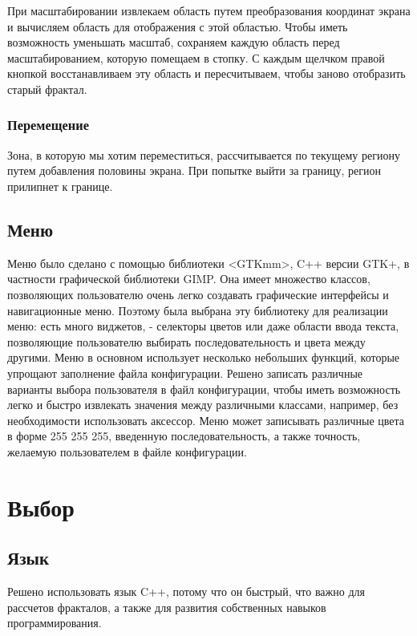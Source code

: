\documentclass[a5paper,10pt, twoside]{article} %
\begin{document}
  При масштабировании извлекаем область путем преобразования координат экрана и вычисляем область 
  для отображения с этой областью.
  Чтобы иметь возможность уменьшать масштаб, сохраняем каждую область перед масштабированием, которую помещаем в стопку.
  С каждым щелчком правой кнопкой восстанавливаем эту область и пересчитываем, чтобы заново отобразить старый фрактал.

  \subsubsection{Перемещение}
  
  Зона, в которую мы хотим переместиться, рассчитывается по текущему региону путем добавления половины экрана.
  При попытке выйти за границу, регион прилипнет к границе.

  \subsection{Меню}
  Меню было сделано с помощью библиотеки <GTKmm>, C++ версии GTK+, в частности графической библиотеки GIMP.
  Она имеет множество классов, позволяющих пользователю очень легко создавать графические интерфейсы и навигационные меню.
  Поэтому была выбрана эту библиотеку для реализации меню: есть много виджетов, - селекторы цветов или даже области ввода 
  текста, позволяющие пользователю выбирать последовательность и цвета между другими.
  Меню в основном использует несколько небольших функций, которые упрощают заполнение файла конфигурации.
  Решено записать различные варианты выбора пользователя в файл конфигурации, чтобы иметь возможность легко 
  и быстро извлекать значения между различными классами, например, без необходимости использовать аксессор.
  Меню может записывать различные цвета в форме 255 255 255, введенную последовательность, а также точность, 
  желаемую пользователем в файле конфигурации.

\section{Выбор}

  \subsection{Язык}
  
  Решено использовать язык C++, потому что он быстрый, что важно для рассчетов фракталов, а также для 
  развития собственных навыков программирования.
\end{document}
